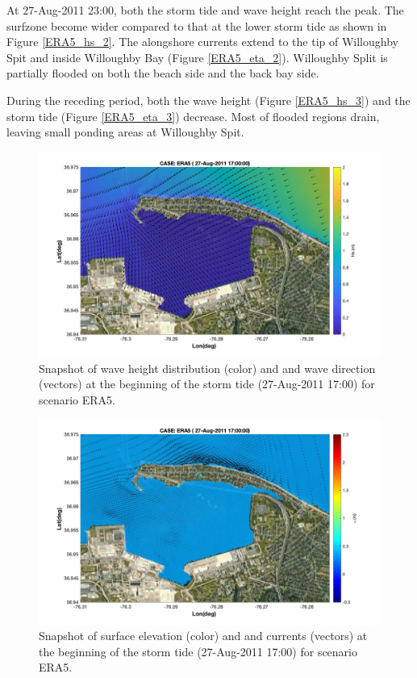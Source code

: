 \documentclass[11pt]{article}
\begin{document}
 At  27-Aug-2011 23:00, both the storm tide and wave height reach the peak. The surfzone become wider compared to that at the lower storm tide as shown in Figure \ref{ERA5_hs_2}. The alongshore currents extend to the tip of Willoughby Spit and inside Willoughby Bay (Figure \ref{ERA5_eta_2}). Willoughby Split is partially flooded on both the beach side and the back bay side. 
 
 During the receding period, both the wave height (Figure \ref{ERA5_hs_3}) and the storm tide (Figure \ref{ERA5_eta_3}) decrease. Most of flooded regions drain, leaving small ponding areas at Willoughby Spit.   

\begin{figure}[h!]
\centering
\includegraphics[width=\textwidth]{./figures/nearcom_hs_ERA5_55.jpg}
\caption{Snapshot of wave height distribution (color) and and wave direction (vectors) at the beginning of the storm tide (27-Aug-2011 17:00) for scenario ERA5.}
\label{ERA5_hs_1}
\centering
\end{figure}

\begin{figure}[h!]
\centering
\includegraphics[width=\textwidth]{./figures/nearcom_ele_ERA5_55.jpg}
\caption{Snapshot of surface elevation (color) and and currents (vectors) at the beginning of the storm tide (27-Aug-2011 17:00) for scenario ERA5.}
\label{ERA5_eta_1}
\centering
\end{figure}
\end{document}
